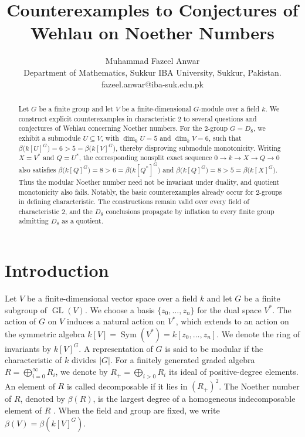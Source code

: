 \documentclass[11pt]{article}
\title{Counterexamples to Conjectures of Wehlau on Noether Numbers}
\author{Muhammad Fazeel Anwar\\
	\small Department of Mathematics, Sukkur IBA University, Sukkur, Pakistan. \\ fazeel.anwar@iba-suk.edu.pk}
\theoremstyle{definition}
\newcommand{\Sym}{\operatorname{Sym}}
\newcommand{\GL}{\operatorname{GL}}
\begin{document}
\maketitle

\begin{abstract}
		Let $G$ be a finite group and let $V$ be a finite-dimensional $G$-module over a field $k$. We construct explicit counterexamples in characteristic $2$ to several questions and conjectures of Wehlau concerning Noether numbers. For the $2$-group $G=D_8$, we exhibit a submodule $U\subseteq V$, with $\dim_kU=5$ and $\dim_kV=6$, such that $\beta\bigl(k[U]^G\bigr)=6>5=\beta\bigl(k[V]^G\bigr)$, thereby disproving submodule monotonicity. Writing $X=V^*$ and $Q=U^*$, the corresponding nonsplit exact sequence $0\longrightarrow k\longrightarrow X\longrightarrow Q\longrightarrow0$
		also satisfies $\beta\bigl(k[Q]^G\bigr)=8>6=\beta\bigl(k[Q^*]^G\bigr)$
		and $\beta\bigl(k[Q]^G\bigr)=8>5=\beta\bigl(k[X]^G\bigr)$. Thus the modular Noether number need not be invariant under duality, and quotient monotonicity also fails. Notably, the basic counterexamples already occur for $2$-groups in defining characteristic. The constructions remain valid over every field of characteristic $2$, and the $D_8$ conclusions propagate by inflation to every finite group admitting $D_8$ as a quotient.
	\end{abstract}

	\section{Introduction}
	Let $V$ be a finite-dimensional vector space over a field $k$ and let $G$ be a finite subgroup of $\GL(V)$. We choose a basis $\{z_0,\ldots,z_n\}$ for the dual space $V^*$. The action of $G$ on $V$ induces a natural action on $V^*$, which extends to an action on the symmetric algebra $k[V]=\Sym(V^*)=k[z_0,\ldots,z_n]$. We denote the ring of invariants by $k[V]^G$. A representation of $G$ is said to be modular if the characteristic of $k$ divides $|G|$. For a finitely generated graded algebra $R=\bigoplus_{i=0}^{\infty}R_i$, we denote by $R_{+}=\bigoplus_{i>0}R_i$ its ideal of positive-degree elements. An element of $R$ is called decomposable if it lies in $(R_{+})^2$. The Noether number of $R$, denoted by $\beta(R)$, is the largest degree of a homogeneous indecomposable element of $R$ \cite{ShWe}. When the field and group are fixed, we write $\beta(V)=\beta(k[V]^G)$.
	
	
	
\end{document}
